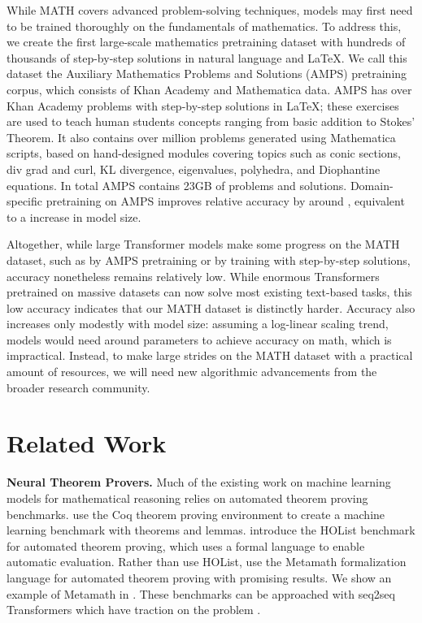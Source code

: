 \documentclass{article}
\begin{document}
While MATH covers advanced problem-solving techniques, models 
may first need to be trained thoroughly on the fundamentals of 
mathematics. To address this, 
we create the first large-scale mathematics pretraining dataset with hundreds of thousands of step-by-step solutions in natural language and \LaTeX{}.
We call this dataset the Auxiliary Mathematics Problems and Solutions (AMPS) pretraining corpus, which consists of Khan Academy and Mathematica data. AMPS has over  Khan Academy problems with step-by-step solutions in \LaTeX{}; these exercises are used to teach human students concepts ranging from basic addition to Stokes' Theorem.
It also contains over  million problems generated using Mathematica scripts, based on  hand-designed modules covering topics such as conic sections, div grad and curl, KL divergence, eigenvalues, polyhedra, and Diophantine equations. In total AMPS contains 
23GB of problems and solutions.
Domain-specific pretraining \citep{Gururangan2020DontSP} on AMPS improves relative accuracy by around , equivalent to a  increase in model size.



Altogether, 
while large Transformer models \citep{Vaswani2017AttentionIA} make some progress on the MATH dataset, such as by AMPS pretraining or by training with step-by-step solutions, accuracy nonetheless remains relatively low.
While enormous Transformers pretrained on massive datasets can now solve most existing text-based tasks, this low accuracy indicates that our MATH dataset is distinctly harder. 
Accuracy also increases only modestly with model size: 
assuming a log-linear scaling trend, models would need around  parameters to achieve  accuracy on math, which is impractical. 
Instead, to make large strides on the MATH dataset with a practical amount of resources, we will need new algorithmic advancements from the broader research community.








 \section{Related Work}

\textbf{Neural Theorem Provers.}\quad
Much of the existing work on machine learning models for mathematical reasoning relies on automated theorem proving benchmarks.
\citet{Huang2019GamePadAL} use the Coq theorem proving environment to create a machine learning benchmark with  theorems and lemmas. \citet{Bansal2019HOListAE} introduce the HOList benchmark for automated theorem proving, which uses a formal language to enable automatic evaluation. Rather than use HOList, \citet{Polu2020GenerativeLM} use the Metamath formalization language for automated theorem proving with promising results. We show an example of Metamath in . These benchmarks can be approached with seq2seq \citep{Sutskever2014SequenceTS} Transformers which have traction on the problem \citep{Polu2020GenerativeLM, Rabe2020MathematicalRV, Li2020ModellingHM}.
\end{document}
